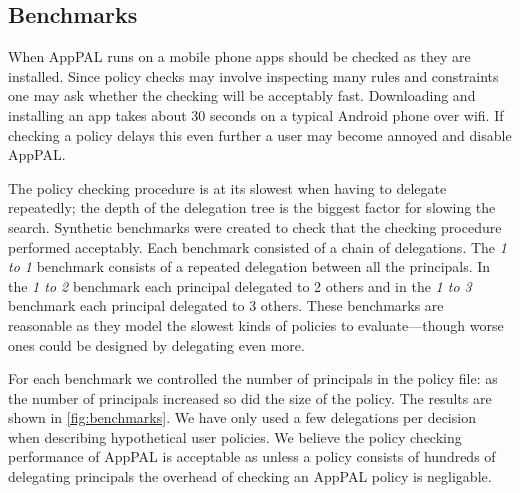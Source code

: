 \documentclass[]{llncs}
\begin{document}
\subsection{Benchmarks}
\label{ssec:benchmarks}

When AppPAL runs on a mobile phone apps should be checked as they are installed.
Since policy checks may involve inspecting many rules and constraints one may ask whether the checking will be acceptably fast.
Downloading and installing an app takes about 30 seconds on a typical Android phone over wifi.
If checking a policy delays this even further a user may become annoyed and disable AppPAL.

The policy checking procedure is at its slowest when having to delegate repeatedly;
   the depth of the delegation tree is the biggest factor for slowing the search.
Synthetic benchmarks were created to check that the checking procedure performed acceptably.
Each benchmark consisted of a chain of delegations.
The \emph{1 to 1} benchmark consists of a repeated delegation between all the principals.
In the \emph{1 to 2} benchmark each principal delegated to 2 others and in the \emph{1 to 3} benchmark each principal delegated to 3 others.
These benchmarks are reasonable as they model the slowest kinds of policies to evaluate---though worse ones could be designed by delegating even more.

For each benchmark we controlled the number of principals in the policy file:
  as the number of principals increased so did the size of the policy.
The results are shown in \autoref{fig:benchmarks}.
We have only used a few delegations per decision when describing hypothetical user policies.
We believe the policy checking performance of AppPAL is acceptable as unless a policy consists of hundreds of delegating principals the overhead of checking an AppPAL policy is negligable.
\end{document}
